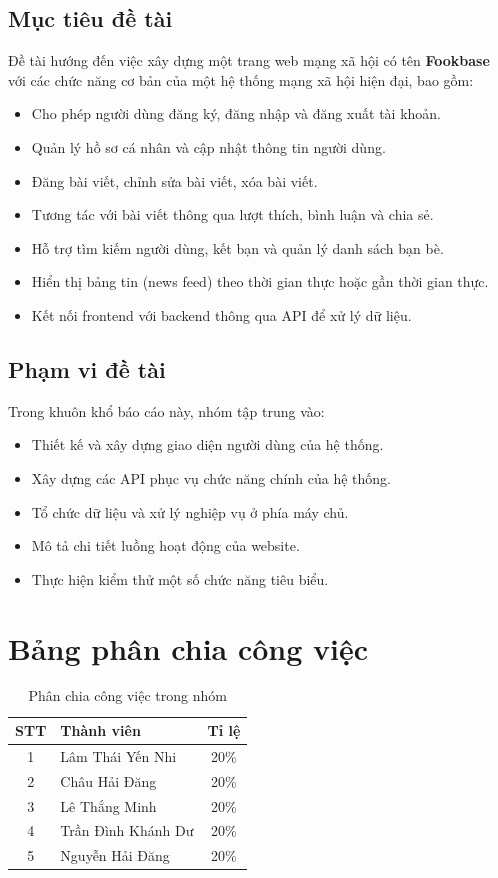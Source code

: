 \documentclass[a4paper,12pt]{article}
\begin{document}
\subsection{Mục tiêu đề tài}
Đề tài hướng đến việc xây dựng một trang web mạng xã hội có tên \textbf{Fookbase} với các chức năng cơ bản của một hệ thống mạng xã hội hiện đại, bao gồm:
\begin{itemize}
    \item Cho phép người dùng đăng ký, đăng nhập và đăng xuất tài khoản.
    \item Quản lý hồ sơ cá nhân và cập nhật thông tin người dùng.
    \item Đăng bài viết, chỉnh sửa bài viết, xóa bài viết.
    \item Tương tác với bài viết thông qua lượt thích, bình luận và chia sẻ.
    \item Hỗ trợ tìm kiếm người dùng, kết bạn và quản lý danh sách bạn bè.
    \item Hiển thị bảng tin (news feed) theo thời gian thực hoặc gần thời gian thực.
    \item Kết nối frontend với backend thông qua API để xử lý dữ liệu.
\end{itemize}

\subsection{Phạm vi đề tài}
Trong khuôn khổ báo cáo này, nhóm tập trung vào:
\begin{itemize}
    \item Thiết kế và xây dựng giao diện người dùng của hệ thống.
    \item Xây dựng các API phục vụ chức năng chính của hệ thống.
    \item Tổ chức dữ liệu và xử lý nghiệp vụ ở phía máy chủ.
    \item Mô tả chi tiết luồng hoạt động của website.
    \item Thực hiện kiểm thử một số chức năng tiêu biểu.
\end{itemize}

\section{Bảng phân chia công việc}

\begin{table}[H]
\centering
\caption{Phân chia công việc trong nhóm}
\begin{tabular}{|c|l|c|}
\hline
\textbf{STT} & \textbf{Thành viên} & \textbf{Tỉ lệ} \\
\hline
1 & Lâm Thái Yến Nhi & 20\% \\
2 & Châu Hải Đăng & 20\% \\
3 & Lê Thắng Minh & 20\% \\
4 & Trần Đình Khánh Dư & 20\% \\
5 & Nguyễn Hải Đăng & 20\% \\
\hline
\end{tabular}
\end{table}
\end{document}

